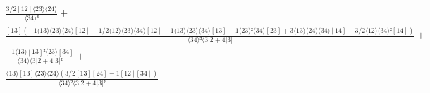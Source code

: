 \documentclass[varwidth, border=5pt]{standalone}
\begin{document}
\begin{my}
$\begin{gathered}
\scriptscriptstyle\frac{3/2[12]⟨23⟩⟨24⟩}{⟨34⟩³} +\\
\scriptscriptstyle\frac{[13](-1⟨13⟩⟨23⟩⟨24⟩[12]+1/2⟨12⟩⟨23⟩⟨34⟩[12]+1⟨13⟩⟨23⟩⟨34⟩[13]-1⟨23⟩²⟨34⟩[23]+3⟨13⟩⟨24⟩⟨34⟩[14]-3/2⟨12⟩⟨34⟩²[14])}{⟨34⟩³⟨3|2+4|3]} +\\
\scriptscriptstyle\frac{-1⟨13⟩[13]²⟨23⟩[34]}{⟨34⟩⟨3|2+4|3]²} +\\
\scriptscriptstyle\frac{⟨13⟩[13]⟨23⟩⟨24⟩(3/2[13][24]-1[12][34])}{⟨34⟩²⟨3|2+4|3]²} \phantom{+}
\end{gathered}$
\end{my}
\end{document}
